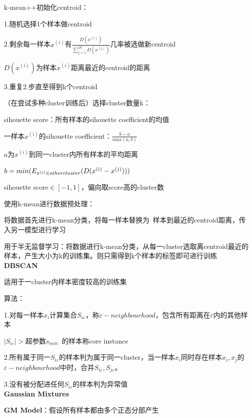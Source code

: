 \documentclass[UTF8]{ctexart}
\begin{document}
  \quad k-mean++初始化centroid：

  \quad \quad 1.随机选择1个样本做centroid

  \quad \quad 2.剩余每一样本$x^{(i)}$有$\frac{D(x^{(i)})}{\sum_{j=1}^{|S|} D(x^{(j)})}$几率被选做新centroid

  \quad \quad \quad $D(x^{(i)})$为样本$x^{(i)}$距离最近的centroid的距离

  \quad \quad 3.重复2.步直至得到k个centroid

  \quad （在尝试多种cluster训练后）选择cluster数量k：

  \quad \quad sihouette score：所有样本的sihouette coefficient的均值

  \quad \quad \quad 一样本$x^{(i)}$的sihouette coefficient：$\frac{b-a}{max(a, b)}$

  \quad \quad \quad \quad $a$为$x^{(i)}$到同一cluster内所有样本的平均距离
  
  \quad \quad \quad \quad $b = min(E_{x^{(j)} \in other \space cluster}(D(x^{(i)} - x^{(j)})))$

  \quad \quad \quad sihouette score$\in [-1, 1]$，偏向取score高的cluster数

  使用k-mean进行数据预处理：

  \quad 将数据首先进行k-mean分类，将每一样本替换为\ 样本到最近的centroid距离，传入另一模型进行学习

  \quad 用于半无监督学习：将数据进行k-mean分类，从每一cluster选取离centroid最近的样本，产生大小为k的训练集。则只需得到k个样本的标签即可进行训练\\
\textbf{DBSCAN}

  适用于一cluster内样本密度较高的训练集

  算法：

  \quad 1.对每一样本$x_i$计算集合$S_{i\varepsilon}$，称$\varepsilon -neighbourhood$，包含所有距离在$\varepsilon $内的其他样本

  \quad \quad $|S_{i\varepsilon}| > $超参数$s_{min}$\ 的样本称core instance

  \quad 2.所有属于同一$S_{i\varepsilon }$的样本判为属于同一cluster，当一样本$x_i$同时存在样本$x_i, x_j$的$\varepsilon -neighbourhood$中时，合并$S_{i\varepsilon }, S_{j\varepsilon }$。

  \quad 3.没有被分配进任何$S_{i\varepsilon }$的样本判为异常值\\
\textbf{Gaussian Mixtures}

  \textbf{GM Model}：假设所有样本都由多个正态分部产生


\end{document}
